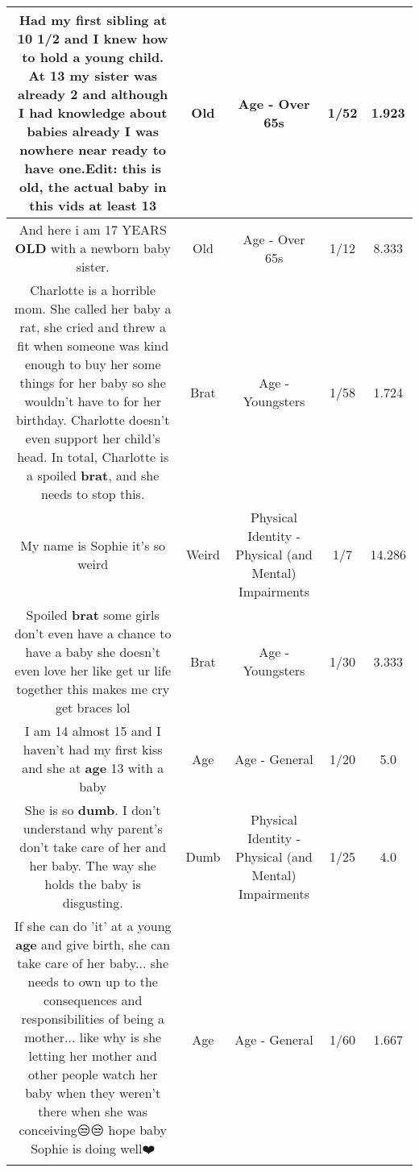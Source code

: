 \documentclass[11pt]{article}
\newlength\mylength
\begin{document}
\begin{center}
\begin{longtable}{|C{.65\mylength}|C{.30\mylength}|C{.12\mylength}|C{.12\mylength}|C{.12\mylength}|}
  \small Had my first sibling at 10 1/2 and I knew how to hold a young child. At 13 my sister was already 2 and although I had knowledge about babies already I was nowhere near ready to have one.Edit: this is \textbf{old}, the actual baby in this vids at least 13\normalsize   & Old & Age - Over 65s & 1/52 & 1.923 \\  \hline
  \small And here i am 17 YEARS \textbf{OLD} with a newborn baby sister.\normalsize   & Old & Age - Over 65s & 1/12 & 8.333 \\  \hline
  \small Charlotte is a horrible mom. She called her baby a rat, she cried and threw a fit when someone was kind enough to buy her some things for her baby so she wouldn't have to for her birthday. Charlotte doesn't even support her child's head. In total, Charlotte is a spoiled \textbf{brat}, and she needs to stop this.\normalsize   & Brat & Age - Youngsters & 1/58 & 1.724 \\  \hline
  \small My name is Sophie it's so weird\normalsize   & Weird & Physical Identity - Physical (and Mental) Impairments & 1/7 & 14.286 \\  \hline
  \small Spoiled \textbf{brat} some girls don't even have a chance to have a baby she doesn't even love her like get ur life together this makes me cry get braces lol\normalsize   & Brat & Age - Youngsters & 1/30 & 3.333 \\  \hline
  \small I am 14 almost 15 and I haven't had my first kiss and she at \textbf{age} 13 with a baby\normalsize   & Age & Age - General & 1/20 & 5.0 \\  \hline
  \small She is so \textbf{dumb}. I don't understand why parent's don't take care of her and her baby. The way she holds the baby is disgusting.\normalsize   & Dumb & Physical Identity - Physical (and Mental) Impairments & 1/25 & 4.0 \\  \hline
  \small If she can do 'it' at a young \textbf{age} and give birth, she can take care of her baby... she needs to own up to the consequences and responsibilities of being a mother... like why is she letting her mother and other people watch her baby when they weren't there when she was conceiving😒😒 hope baby Sophie is doing well❤️\normalsize   & Age & Age - General & 1/60 & 1.667 \\  \hline

\end{longtable}
\end{center}
\end{document}

